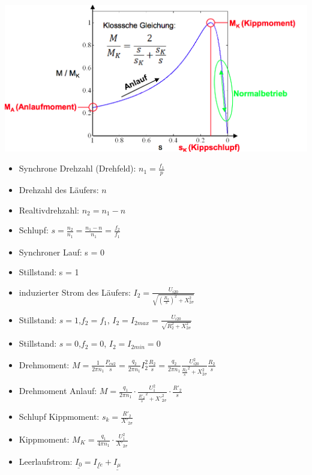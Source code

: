 \begin{minipage}{0.3 \linewidth}
\includegraphics[width = \linewidth]{./Pics/VL1213/Funktion4}
\end{minipage}
\begin{minipage}{0.7 \linewidth}
\begin{itemize}
\item Synchrone Drehzahl (Drehfeld): $n_1 = \frac{f_1}{p}$
\item Drehzahl des Läufers: $n$
\item Realtivdrehzahl: $n_2 = n_1 - n$
\item Schlupf: $s = \frac{n_2}{n_1} = \frac{n_1-n}{n_1} = \frac{f_2}{f_1}$
\item Synchroner Lauf: s = 0
\item Stillstand: s = 1
\item induzierter Strom des Läufers: $I_2 = \frac{U_{i20}}{\sqrt{(\frac{R_2}{s})^2 + X_{2\sigma}^2}}$
\item Stillstand: $s = 1$,$f_2 = f_1$, $I_2 = I_{2max} = \frac{U_{i20}}{\sqrt{R_2^2 + X_{2\sigma}^2}}$
\item Stillstand: $s = 0$,$f_2 = 0$, $I_2 = I_{2min} = 0$
\item Drehmoment: $M = \frac{1}{2\pi n_1} \frac{P_{cu2}}{s} = \frac{q_2}{2\pi n_1} I_2^2 \frac{R_2}{s} = \frac{q_2}{2 \pi n_1} \frac{U_{i20}^2}{\frac{R_2}{s}^2 + X_{2\sigma}^2} \frac{R_2}{s}$
\item Drehmoment Anlauf: $M = \frac{q_1}{2 \pi n_1} \cdot \frac{U_1^2}{\frac{R'_2}{s}^2 + X'^2_{2\sigma}} \cdot \frac{R'_2}{s}$
\item Schlupf Kippmoment: $s_k = \frac{R'_2}{X'_{2\sigma}}$
\item Kippmoment: $M_K = \frac{q_1}{4\pi n_1} \cdot \frac{U_1^2}{X'_{2\sigma}}$
\item Leerlaufstrom: $\underline{I_0} = \underline{I_{fe}} + \underline{I_\mu}$
\end{itemize}
\end{minipage}

